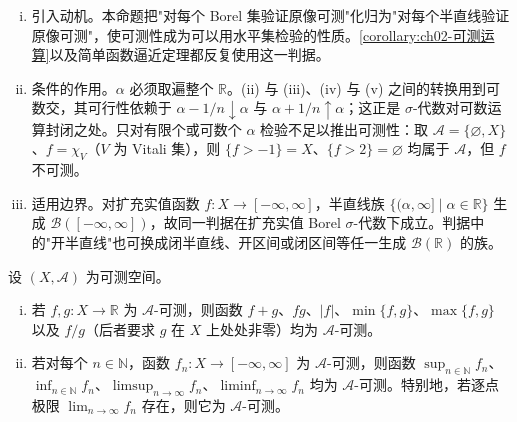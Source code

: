 \documentclass[../../main.tex]{subfiles}%
\begin{document}
\begin{remark}\label{remark:ch02-可测判据}
\begin{enumerate}[(i)]
\item 引入动机。本命题把"对每个 Borel 集验证原像可测"化归为"对每个半直线验证原像可测"，使可测性成为可以用水平集检验的性质。\cref{corollary:ch02-可测运算}以及简单函数逼近定理都反复使用这一判据。
\item 条件的作用。$\alpha$ 必须取遍整个 $\mathbb{R}$。(ii) 与 (iii)、(iv) 与 (v) 之间的转换用到可数交，其可行性依赖于 $\alpha-1/n\downarrow\alpha$ 与 $\alpha+1/n\uparrow\alpha$；这正是 $\sigma$-代数对可数运算封闭之处。只对有限个或可数个 $\alpha$ 检验不足以推出可测性：取 $\mathscr A=\{\varnothing,X\}$、$f=\chi_V$（$V$ 为 Vitali 集），则 $\{f>-1\}=X$、$\{f>2\}=\varnothing$ 均属于 $\mathscr A$，但 $f$ 不可测。
\item 适用边界。对扩充实值函数 $f:X\to[-\infty,\infty]$，半直线族 $\{(\alpha,\infty]\mid\alpha\in\mathbb{R}\}$ 生成 $\mathscr B([-\infty,\infty])$，故同一判据在扩充实值 Borel $\sigma$-代数下成立。判据中的"开半直线"也可换成闭半直线、开区间或闭区间等任一生成 $\mathscr B(\mathbb{R})$ 的族。
\end{enumerate}
\end{remark}

\begin{corollary}\label{corollary:ch02-可测运算}\label{corollary:ch02-逐点极限}
设 $(X,\mathscr A)$ 为可测空间。
\begin{enumerate}[(i)]
\item 若 $f,g:X\to\mathbb{R}$ 为 $\mathscr A$-可测，则函数 $f+g$、$fg$、$|f|$、$\min\{f,g\}$、$\max\{f,g\}$ 以及 $f/g$（后者要求 $g$ 在 $X$ 上处处非零）均为 $\mathscr A$-可测。
\item 若对每个 $n\in\mathbb{N}$，函数 $f_n:X\to[-\infty,\infty]$ 为 $\mathscr A$-可测，则函数 $\sup_{n\in\mathbb{N}}f_n$、$\inf_{n\in\mathbb{N}}f_n$、$\limsup_{n\to\infty}f_n$、$\liminf_{n\to\infty}f_n$ 均为 $\mathscr A$-可测。特别地，若逐点极限 $\lim_{n\to\infty}f_n$ 存在，则它为 $\mathscr A$-可测。
\end{enumerate}
\end{corollary}
\end{document}
